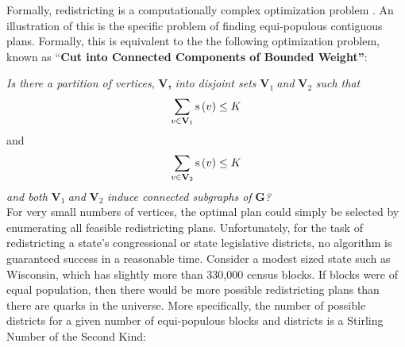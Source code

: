 \documentclass[article]{JSSstyle/jss}
\newcommand\textsubscript[1]{\ensuremath{{}_{\text{#1}}}}
\begin{document}
Formally, redistricting is a computationally complex optimization 
problem \citep[][]{Altman97}. An illustration of this is the specific problem of finding equi-populous contiguous plans. Formally, this is equivalent to the the following optimization problem, known as
``\textbf{Cut into Connected Components of Bounded Weight''}\citep[see][]{Altman97}: 

\emph{Is there a partition of vertices}, \textbf{V,}\textit{ } \emph{into disjoint
sets} \textbf{V}\textit{\textsubscript{1 }}\emph{and}
\textbf{V}\textit{\textsubscript{2}} \emph{such that} 
\[
\sum\limits_{v \in {\bf V}_1 } {{\rm s}\left( v \right)}  \le K
\]
 and 
\[
\sum\limits_{v \in {\bf V}_2 } {{\rm s}\left( v \right)}  \le K
\]
\emph{and both}
\textbf{V}\textit{\textsubscript{1 }}\emph{and}
\textbf{V}\textit{\textsubscript{2}} \emph{induce connected subgraphs of}
\textbf{G}\textit{?}
\\
For very small numbers of vertices, the optimal plan could simply 
be selected by enumerating all feasible redistricting plans.  
Unfortunately, for the task of redistricting a state's congressional 
or state legislative districts, no algorithm is guaranteed success 
in a reasonable time.  Consider a modest sized state such as 
Wisconsin, which has slightly more than 330,000 census blocks.  If 
blocks were of equal population, then there would be more possible redistricting 
plans than there are quarks in the universe.  More specifically, the number of
possible districts for a given number of equi-populous blocks and districts 
is a Stirling Number of the Second Kind:
\end{document}
